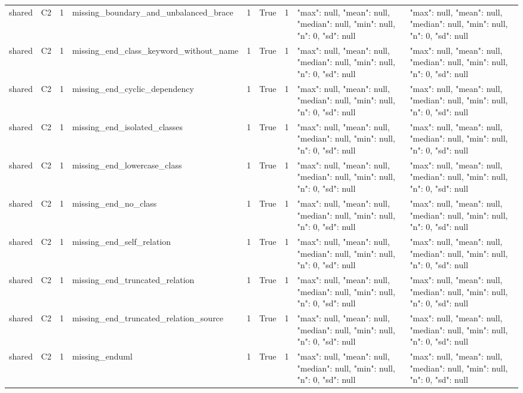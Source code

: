 \begin{tabular}{lllllllll}
shared & C2 & 1 & missing\_boundary\_and\_unbalanced\_brace & 1 & True & 1 & {"max": null, "mean": null, "median": null, "min": null, "n": 0, "sd": null} & {"max": null, "mean": null, "median": null, "min": null, "n": 0, "sd": null} \\
shared & C2 & 1 & missing\_end\_class\_keyword\_without\_name & 1 & True & 1 & {"max": null, "mean": null, "median": null, "min": null, "n": 0, "sd": null} & {"max": null, "mean": null, "median": null, "min": null, "n": 0, "sd": null} \\
shared & C2 & 1 & missing\_end\_cyclic\_dependency & 1 & True & 1 & {"max": null, "mean": null, "median": null, "min": null, "n": 0, "sd": null} & {"max": null, "mean": null, "median": null, "min": null, "n": 0, "sd": null} \\
shared & C2 & 1 & missing\_end\_isolated\_classes & 1 & True & 1 & {"max": null, "mean": null, "median": null, "min": null, "n": 0, "sd": null} & {"max": null, "mean": null, "median": null, "min": null, "n": 0, "sd": null} \\
shared & C2 & 1 & missing\_end\_lowercase\_class & 1 & True & 1 & {"max": null, "mean": null, "median": null, "min": null, "n": 0, "sd": null} & {"max": null, "mean": null, "median": null, "min": null, "n": 0, "sd": null} \\
shared & C2 & 1 & missing\_end\_no\_class & 1 & True & 1 & {"max": null, "mean": null, "median": null, "min": null, "n": 0, "sd": null} & {"max": null, "mean": null, "median": null, "min": null, "n": 0, "sd": null} \\
shared & C2 & 1 & missing\_end\_self\_relation & 1 & True & 1 & {"max": null, "mean": null, "median": null, "min": null, "n": 0, "sd": null} & {"max": null, "mean": null, "median": null, "min": null, "n": 0, "sd": null} \\
shared & C2 & 1 & missing\_end\_truncated\_relation & 1 & True & 1 & {"max": null, "mean": null, "median": null, "min": null, "n": 0, "sd": null} & {"max": null, "mean": null, "median": null, "min": null, "n": 0, "sd": null} \\
shared & C2 & 1 & missing\_end\_truncated\_relation\_source & 1 & True & 1 & {"max": null, "mean": null, "median": null, "min": null, "n": 0, "sd": null} & {"max": null, "mean": null, "median": null, "min": null, "n": 0, "sd": null} \\
shared & C2 & 1 & missing\_enduml & 1 & True & 1 & {"max": null, "mean": null, "median": null, "min": null, "n": 0, "sd": null} & {"max": null, "mean": null, "median": null, "min": null, "n": 0, "sd": null} \\

\end{tabular}

